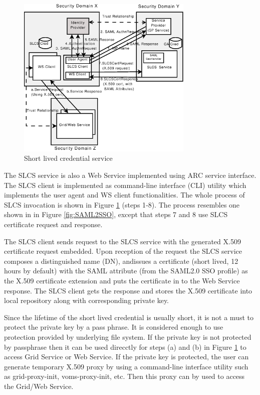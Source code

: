 \begin{figure}
\includegraphics[width=0.75\textwidth]{SLCS.eps}
\caption{Short lived credential service}
\label{fig:SLCS}
\end{figure}
The SLCS service is also a Web Service implemented using ARC service interface. The SLCS client is implemented as command-line interface (CLI) utility which implements the user agent and WS client functionalities. The whole process of SLCS invocation is shown in Figure \ref{fig:SLCS} (steps 1‑8). The process resembles one shown in in Figure \ref{fig:SAML2SSO}, except that steps 7 and 8 use SLCS certificate request and response.

The SLCS client sends request to the SLCS service with the generated X.509 certificate request embedded. Upon reception of the request the SLCS service  composes a distinguished name (DN), andissues a certificate (short lived, 12 hours by default) with the SAML attribute (from the SAML2.0 SSO profile) as the X.509 certificate extension and puts the certificate in to the Web Service response. The SLCS client gets the response and stores the X.509 certificate into local repository along with corresponding private key.

Since the lifetime of the short lived credential is usually short, it is not a must to protect the private key by a pass phrase. It is considered enough to use protection  provided by underlying file system. If the private key is not protected by passphrase then it can be used direcctly for steps (a) and (b) in Figure \ref{fig:SLCS} to access Grid Service or Web Service. If the private key is protected, the user can generate temporary  X.509 proxy by using a command-line interface utility such as grid-proxy-init, voms-proxy-init, etc. Then this proxy can by used  to access the Grid/Web Service.

